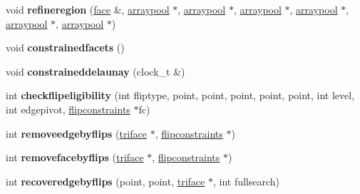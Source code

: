 \begin{DoxyCompactItemize}
\item 
\hypertarget{classtetgenmesh_aa34a5188a4cee82197394560c388c348}{void {\bfseries refineregion} (\hyperlink{classtetgenmesh_1_1face}{face} \&, \hyperlink{classtetgenmesh_1_1arraypool}{arraypool} $\ast$, \hyperlink{classtetgenmesh_1_1arraypool}{arraypool} $\ast$, \hyperlink{classtetgenmesh_1_1arraypool}{arraypool} $\ast$, \hyperlink{classtetgenmesh_1_1arraypool}{arraypool} $\ast$, \hyperlink{classtetgenmesh_1_1arraypool}{arraypool} $\ast$, \hyperlink{classtetgenmesh_1_1arraypool}{arraypool} $\ast$)}\label{classtetgenmesh_aa34a5188a4cee82197394560c388c348}

\item 
\hypertarget{classtetgenmesh_a7579c3a44a54712623d9f9e5fc1dfbdc}{void {\bfseries constrainedfacets} ()}\label{classtetgenmesh_a7579c3a44a54712623d9f9e5fc1dfbdc}

\item 
\hypertarget{classtetgenmesh_aab64d62b3d2b048a38158fb2bf678624}{void {\bfseries constraineddelaunay} (clock\-\_\-t \&)}\label{classtetgenmesh_aab64d62b3d2b048a38158fb2bf678624}

\item 
\hypertarget{classtetgenmesh_afa19bcc54b58a65b05bf43cceaec68ec}{int {\bfseries checkflipeligibility} (int fliptype, point, point, point, point, point, int level, int edgepivot, \hyperlink{classtetgenmesh_1_1flipconstraints}{flipconstraints} $\ast$fc)}\label{classtetgenmesh_afa19bcc54b58a65b05bf43cceaec68ec}

\item 
\hypertarget{classtetgenmesh_aa3b3b69fbbdda1fcce103640425f9694}{int {\bfseries removeedgebyflips} (\hyperlink{classtetgenmesh_1_1triface}{triface} $\ast$, \hyperlink{classtetgenmesh_1_1flipconstraints}{flipconstraints} $\ast$)}\label{classtetgenmesh_aa3b3b69fbbdda1fcce103640425f9694}

\item 
\hypertarget{classtetgenmesh_a74795dd220990bdcf206cdc6686ab336}{int {\bfseries removefacebyflips} (\hyperlink{classtetgenmesh_1_1triface}{triface} $\ast$, \hyperlink{classtetgenmesh_1_1flipconstraints}{flipconstraints} $\ast$)}\label{classtetgenmesh_a74795dd220990bdcf206cdc6686ab336}

\item 
\hypertarget{classtetgenmesh_a558494ab92a7012fae3cfe96bb33f8e9}{int {\bfseries recoveredgebyflips} (point, point, \hyperlink{classtetgenmesh_1_1triface}{triface} $\ast$, int fullsearch)}\label{classtetgenmesh_a558494ab92a7012fae3cfe96bb33f8e9}


\end{DoxyCompactItemize}
